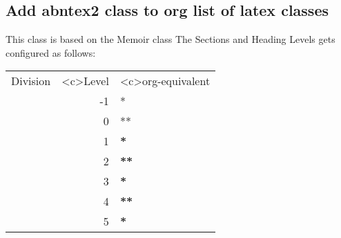 \documentclass[11pt]{article}
\begin{document}
\subsection*{Add abntex2 class to org list of latex classes}
\label{sec:orgc6a7ad3}
This class is based on the Memoir class
The Sections and Heading Levels gets configured as follows:

\begin{center}
\begin{tabular}{lrl}
Division & <c>Level & <c>org-equivalent\\
\part & -1 & *\\
\chapter & 0 & **\\
\section & 1 & \textbf{*}\\
\subsection & 2 & \textbf{**}\\
\subsubsection & 3 & \textbf{\textbf{*}}\\
\paragraph & 4 & \textbf{\textbf{**}}\\
\subparagraph & 5 & \textbf{\textbf{\textbf{*}}}\\
\end{tabular}
\end{center}
\end{document}
